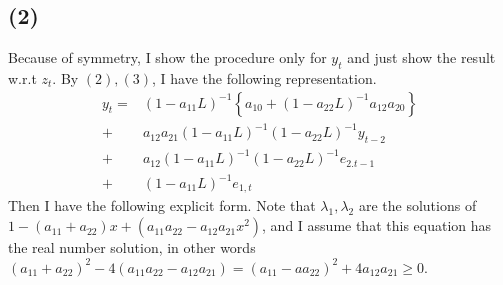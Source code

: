 \documentclass{article}
\begin{document}
\subsection{(2)}
 Because of symmetry, I show the procedure only for $y_t$ and just show the result w.r.t $z_t$. By $(2),(3)$, I have the following representation.
\begin{align*}
	y_t = &(1-a_{11}L)^{-1}\left\{ a_{10}+(1-a_{22}L)^{-1} a_{12}a_{20} \right\} \\
	+ &a_{12}a_{21}(1-a_{11}L)^{-1}(1-a_{22}L)^{-1}y_{t-2} \\
	+ &a_{12}(1-a_{11}{L})^{-1}(1-a_{22}L)^{-1}e_{2.t-1}\\
	+ &(1-a_{11}L)^{-1}e_{1,t}
\end{align*}
Then I have the following explicit form. Note that $\lambda_1, \lambda_2$ are the solutions of $1-(a_{11} + a_{22})x + (a_{11}a_{22} - a_{12}a_{21}x^2)$, and I assume that this equation has the real number solution, in other words $(a_{11} +a_{22})^2 -4(a_{11}a_{22} - a_{12}a_{21}) = (a_{11} -aa_{22})^2 + 4a_{12}a_{21} \geq 0$.
\end{document}
